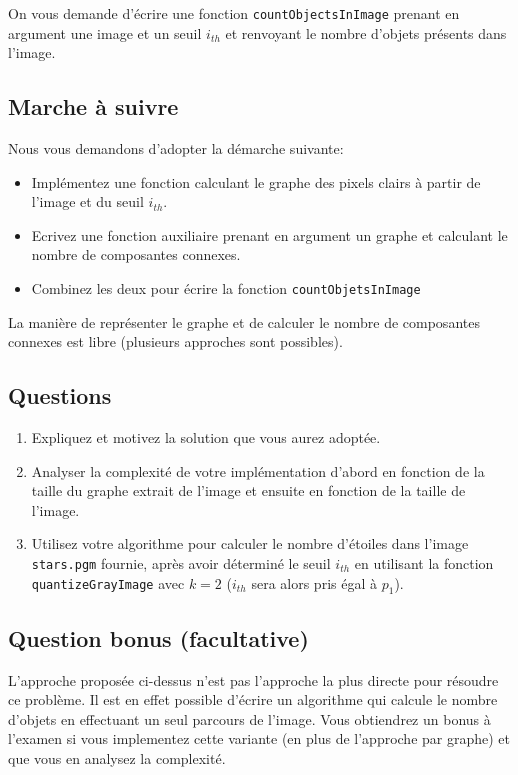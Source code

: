 \documentclass[a4paper,10pt]{article}
\begin{document}
On vous demande d'écrire une fonction \texttt{countObjectsInImage}
prenant en argument une image et un seuil $i_{th}$ et renvoyant le
nombre d'objets présents dans l'image.

\subsection*{Marche à suivre}

Nous vous demandons d'adopter la démarche suivante:
\begin{itemize}
\item Implémentez une fonction calculant le graphe des pixels clairs à partir de l'image et du seuil $i_{th}$.
\item Ecrivez une fonction auxiliaire prenant en argument un graphe et calculant le nombre de composantes connexes.
\item Combinez les deux pour écrire la fonction \texttt{countObjetsInImage}
\end{itemize}
La manière de représenter le graphe et de calculer le nombre de composantes connexes est libre (plusieurs approches sont possibles).

\subsection*{Questions}

\begin{enumerate}
\item Expliquez et motivez la solution que vous aurez adoptée.
\item Analyser la complexité de votre implémentation d'abord en fonction de la
  taille du graphe extrait de l'image et ensuite en fonction de la taille de
  l'image.
\item Utilisez votre algorithme pour calculer le nombre d'étoiles dans
  l'image \texttt{stars.pgm} fournie, après avoir déterminé le seuil $i_{th}$ en utilisant la fonction \texttt{quantizeGrayImage} avec $k=2$ ($i_{th}$ sera alors pris égal à $p_1$).
\end{enumerate}

\subsection*{Question bonus (facultative)}

L'approche proposée ci-dessus n'est pas l'approche la plus directe
pour résoudre ce problème. Il est en effet possible d'écrire un
algorithme qui calcule le nombre d'objets en effectuant un seul
parcours de l'image. Vous obtiendrez un bonus à l'examen si vous
implementez cette variante (en plus de l'approche par graphe) et que
vous en analysez la complexité.
\end{document}
